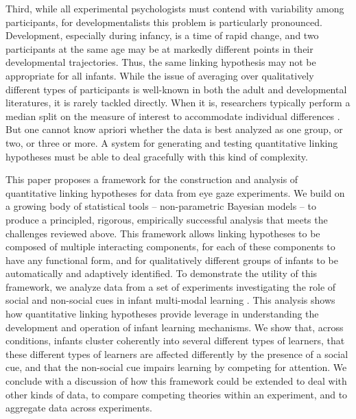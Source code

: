 \documentclass[12pt]{article}
\begin{document}
	Third, while all experimental psychologists must contend with variability among participants, for developmentalists this problem is particularly pronounced. Development, especially during infancy, is a time of rapid change, and two participants at the same age may be at markedly different points in their developmental trajectories. Thus, the same linking hypothesis may not be appropriate for all infants. While the issue of averaging over qualitatively different types of participants is well-known in both the adult \cite{Estes1956, Gallistel2004} and developmental \cite{Siegler1987} literatures, it is rarely tackled directly. When it is, researchers typically perform a median split on the measure of interest to accommodate individual differences \cite{Marchman2008, Mather2010a}. But one cannot know apriori whether the data is best analyzed as one group, or two, or three or more. A system for generating and testing quantitative linking hypotheses must be able to deal gracefully with this kind of complexity.
	
	This paper proposes a framework for the construction and analysis of quantitative linking hypotheses for data from eye gaze experiments. We build on a growing body of statistical tools -- non-parametric Bayesian models -- to produce a principled, rigorous, empirically successful analysis that meets the challenges reviewed above. This framework allows linking hypotheses to be composed of multiple interacting components, for each of these components to have any functional form, and for qualitatively different groups of infants to be automatically and adaptively identified. To demonstrate the utility of this framework, we analyze data from a set of experiments investigating the role of social and non-social cues in infant multi-modal learning \cite{Wu2010a}. This analysis shows how quantitative linking hypotheses provide leverage in understanding the development and operation of infant learning mechanisms. We show that, across conditions, infants cluster coherently into several different types of learners, that these different types of learners are affected differently by the presence of a social cue, and that the non-social cue impairs learning by competing for attention. We conclude with a discussion of how this framework could be extended to deal with other kinds of data, to compare competing theories within an experiment, and to aggregate data across experiments.
	
\end{document}
